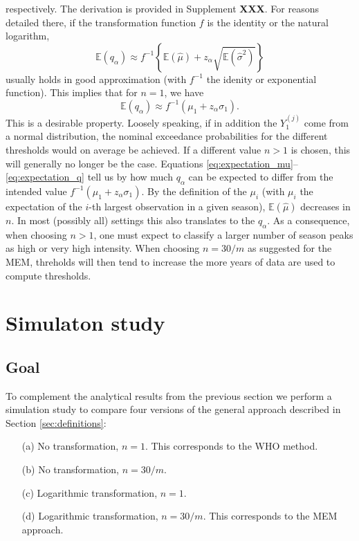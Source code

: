 \documentclass{article}
\begin{document}
respectively. The derivation is provided in Supplement \textbf{XXX}. For reasons detailed there, if the transformation function $f$ is the identity or the natural logarithm,
\begin{equation}
\mathbb{E}(q_\alpha) \approx f^{-1}\left\{\mathbb{E}(\hat\mu) + z_\alpha \sqrt{\mathbb{E}(\hat\sigma^2)}\right\}
\label{eq:expectation_q}
\end{equation}
usually holds in good approximation (with $f^{-1}$ the idenity or exponential function). This implies that for $n = 1$, we have
$$
\mathbb{E}(q_\alpha) \approx f^{-1}(\mu_1 + z_\alpha \sigma_1).
$$
This is a desirable property. Loosely speaking, if in addition the $Y_{1}^{(j)}$ come from a normal distribution, the nominal exceedance probabilities for the different thresholds would on average be achieved. If a different value $n > 1$ is chosen, this will generally no longer be the case. Equations \eqref{eq:expectation_mu}--\eqref{eq:expectation_q} tell us by how much $q_\alpha$ can be expected to differ from the intended value $f^{-1}(\mu_1 + z_\alpha \sigma_1)$. By the definition of the $\mu_i$ (with $\mu_i$ the expectation of the $i$-th largest observation in a given season), $\mathbb{E}(\hat\mu)$ decreases in $n$. In most (possibly all) settings this also translates to the $q_\alpha$. As a consequence, when choosing $n > 1$, one must expect to classify a larger number of season peaks as high or very high intensity. When choosing $n = 30/m$ as suggested for the MEM, threholds will then tend to increase the more years of data are used to compute thresholds.

\section{Simulaton study}
\label{sec:simulation}

\subsection{Goal}
\label{subsec:simulation_goal}

To complement the analytical results from the previous section we perform a simulation study to compare four versions of the general approach described in Section \ref{sec:definitions}:
\begin{enumerate}
\item[(a)] No transformation, $n = 1$. This corresponds to the WHO method.
\item[(b)] No transformation, $n = 30/m$.
\item[(c)] Logarithmic transformation, $n = 1$.
\item[(d)] Logarithmic transformation, $n = 30/m$. This corresponds to the MEM approach.
\end{enumerate}
\end{document}
